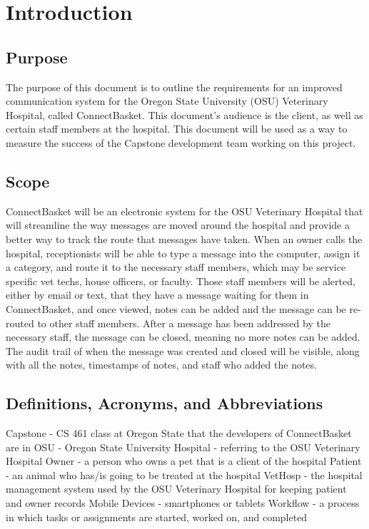 \documentclass[onecolumn, draftclsnofoot,10pt, compsoc]{IEEEtran}
\begin{document}
\section{Introduction}

\subsection{Purpose}
The purpose of this document is to outline the requirements for an improved communication system for the Oregon State University (OSU) Veterinary Hospital, called ConnectBasket. 
This document's audience is the client, as well as certain staff members at the hospital. This document will be used as a way to measure the success of the Capstone development team working on this project. 


\subsection{Scope}
ConnectBasket will be an electronic system for the OSU Veterinary Hospital that will streamline the way messages are moved around the hospital and provide a better way to track the route that messages have taken. When an owner calls the hospital, receptionists will be able to type a message into the computer, assign it a category, and route it to the necessary staff members, which may be service specific vet techs, house officers, or faculty. Those staff members will be alerted, either by email or text, that they have a message waiting for them in ConnectBasket, and once viewed, notes can be added and the message can be re-routed to other staff members. After a message has been addressed by the necessary staff, the message can be closed, meaning no more notes can be added. The audit trail of when the message was created and closed will be visible, along with all the notes, timestamps of notes, and staff who added the notes.


\subsection{Definitions, Acronyms, and Abbreviations}
Capstone - CS 461 class at Oregon State that the developers of ConnectBasket are in 
OSU - Oregon State University
Hospital - referring to the OSU Veterinary Hospital
Owner - a person who owns a pet that is a client of the hospital
Patient - an animal who has/is going to be treated at the hospital 
VetHosp - the hospital management system used by the OSU Veterinary Hospital for keeping patient and owner records
Mobile Devices - smartphones or tablets
Workflow - a process in which tasks or assignments are started, worked on, and completed
\end{document}
